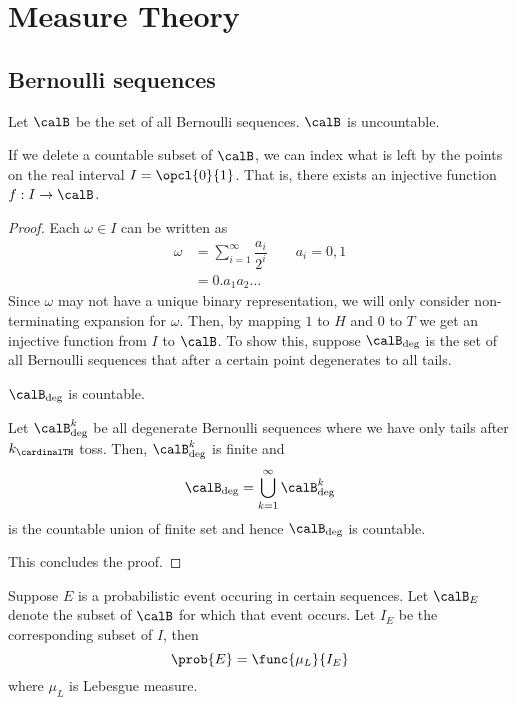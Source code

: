 \chapter{Measure Theory}
\section{Bernoulli sequences}
Let \(\calB\) be the set of all Bernoulli sequences. \(\calB\) is uncountable.
\begin{proposition}
    If we delete a countable subset of \(\calB\), we can index what is left by the points on the real interval \(I = \opcl{0}{1}\). That is, there exists an injective function \(f: I \to \calB\).
\end{proposition}
\begin{proof}
    Each \(\omega \in I\) can be written as 
    \begin{align*}
        \omega &= \sum_{i = 1}^{\infty} \dfrac{a_i}{2^i} \qquad a_i = 0,1\\
        &= 0.a_1a_2\dots
    \end{align*}
    Since \(\omega\) may not have a unique binary representation, we will only consider non-terminating expansion for \(\omega\). Then, by mapping \(1\) to \(H\) and \(0\) to \(T\) we get an injective function from \(I\) to \(\calB\). To show this, suppose \(\calB_{\deg}\) is the set of all Bernoulli sequences that after a certain point degenerates to all tails.
    \begin{lemma}
        \(\calB_{\deg}\) is countable.
    \end{lemma}
    \begin{prooflemma}
        Let \(\calB_{\deg}^k\) be all degenerate Bernoulli sequences where we have only tails after \(k_{\cardinalTH}\) toss. Then, \(\calB_{\deg}^k\) is finite and 
        \begin{equation*}
            \calB_{\deg} = \bigcup_{k = 1}^{\infty} \calB_{\deg}^k
        \end{equation*}
        is the countable union of finite set and hence \(\calB_{\deg}\) is countable.
    \end{prooflemma}

    This concludes the proof.
\end{proof}

\begin{definition}
    Suppose \(E\) is a probabilistic event occuring in certain sequences. Let \(\calB_{E}\) denote the subset of \(\calB\) for which that event occurs. Let \(I_E\) be the corresponding subset of \(I\), then 
    \begin{equation*}
        \prob{E} = \func{\mu_L}{I_E}
    \end{equation*}
    where \(\mu_L\) is Lebesgue measure.
\end{definition}

